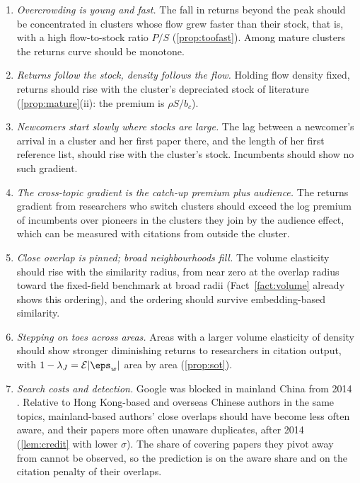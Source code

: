 \begin{enumerate}[label=\textbf{P\arabic*.},leftmargin=*]
\item \emph{Overcrowding is young and fast.} The fall in returns beyond the peak
should be concentrated in clusters whose flow grew faster than their stock, that
is, with a high flow-to-stock ratio $P/S$ (\cref{prop:toofast}). Among mature
clusters the returns curve should be monotone.
\item \emph{Returns follow the stock, density follows the flow.} Holding flow
density fixed, returns should rise with the cluster's depreciated stock of
literature (\cref{prop:mature}(ii): the premium is $\rho S/b_c$).
\item \emph{Newcomers start slowly where stocks are large.} The lag between a
newcomer's arrival in a cluster and her first paper there, and the length of her
first reference list, should rise with the cluster's stock. Incumbents should
show no such gradient.
\item \emph{The cross-topic gradient is the catch-up premium plus audience.} The
returns gradient from researchers who switch clusters should exceed the log
premium of incumbents over pioneers in the clusters they join by the audience
effect, which can be measured with citations from outside the cluster.
\item \emph{Close overlap is pinned; broad neighbourhoods fill.} The volume
elasticity should rise with the similarity radius, from near zero at the overlap
radius toward the fixed-field benchmark at broad radii (Fact~\ref{fact:volume}
already shows this ordering), and the ordering should survive embedding-based
similarity.
\item \emph{Stepping on toes across areas.} Areas with a larger volume elasticity
of density should show stronger diminishing returns to researchers in citation
output, with $1-\lambda_J=\mathcal E|\eps_w|$ area by area (\cref{prop:sot}).
\item \emph{Search costs and detection.} Google was blocked in mainland China
from 2014 \citep{zhengwang2020}. Relative to Hong Kong-based and overseas
Chinese authors in the same topics, mainland-based authors' close overlaps
should have become less often aware, and their papers more often unaware
duplicates, after 2014 (\cref{lem:credit} with lower $\sigma$). The share of
covering papers they pivot away from cannot be observed, so the prediction is
on the aware share and on the citation penalty of their overlaps.
\end{enumerate}

